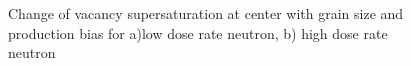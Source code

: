 \documentclass[a4paper]{article}
\begin{document}
      \begin{figure}[htb!]  %
        \centering
        \qquad
        \caption{Change of vacancy supersaturation at center with grain size and production bias for a)low dose rate neutron, b) high dose rate neutron}
        \label{figure:3D_supersaturation_neutron}
      \end{figure}
    \newpage
\end{document}
